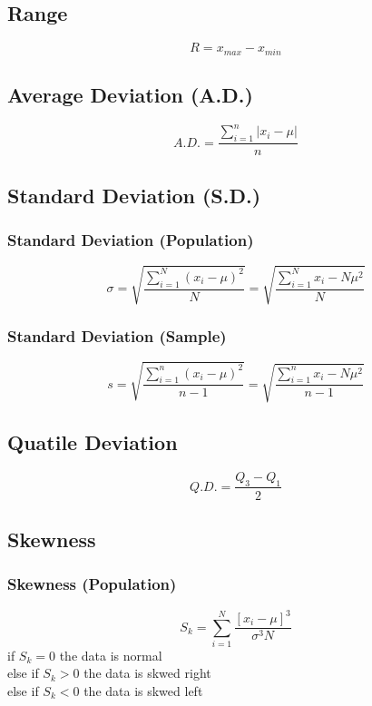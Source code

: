 \documentclass[twocolumn]{article}
\begin{document}
\subsection{Range}
\begin{equation}
    R = x_{max} - x_{min}
\end{equation}
\subsection{Average Deviation (A.D.)}
\begin{equation}
    A.D. = \frac{\sum_{i=1}^{n} |x_{i}-\mu|}{n}
\end{equation}
\subsection{Standard Deviation (S.D.)}
\subsubsection{Standard Deviation (Population)}
\begin{equation}
    \sigma = \sqrt{\frac{\sum_{i=1}^{N} (x_{i}-\mu)^2}{N}} = \sqrt{\frac{\sum_{i=1}^{N} x_{i} -N\mu^2}{N}}
\end{equation}
\subsubsection{Standard Deviation (Sample)}
\begin{equation}
    s = \sqrt{\frac{\sum_{i=1}^{n} (x_{i}-\mu)^2}{n-1}} = \sqrt{\frac{\sum_{i=1}^{n} x_{i} -N\mu^2}{n-1}}
\end{equation}
\subsection{Quatile Deviation}
\begin{equation}
    Q.D. = \frac{Q_{3} - Q_{1}}{2}
\end{equation}

\newpage

\subsection{Skewness}
\subsubsection{Skewness (Population)}
\begin{equation}
    S_{k} = \sum_{i=1}^{N}\frac{[x_{i} - \mu]^{3}}{\sigma^{3}N}
\end{equation}
if $S_{k} = 0$ the data is normal\\
else if $S_{k} > 0$ the data is skwed right\\
else if $S_{k} < 0$ the data is skwed left
\end{document}
